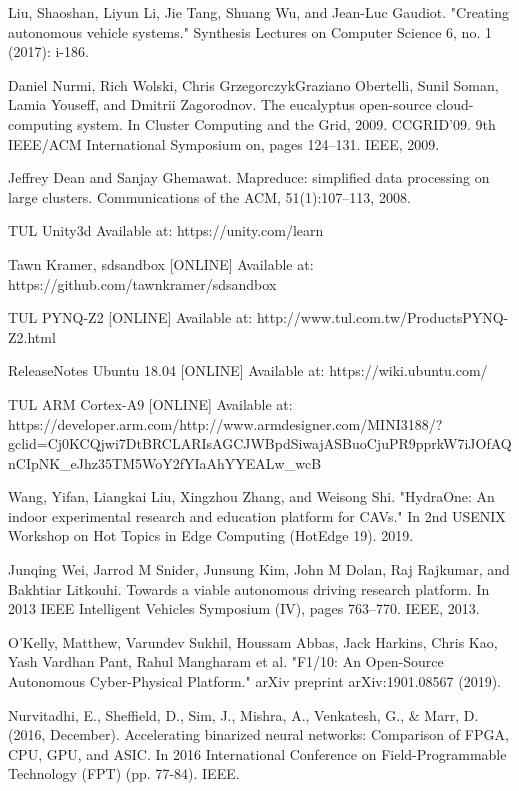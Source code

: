 \documentclass[conference]{IEEEtran}
\begin{document}
\begin{thebibliography}{00}

 Liu, Shaoshan, Liyun Li, Jie Tang, Shuang Wu, and Jean-Luc Gaudiot. "Creating autonomous vehicle systems." Synthesis Lectures on Computer Science 6, no. 1 (2017): i-186.

 Daniel Nurmi, Rich Wolski, Chris GrzegorczykGraziano Obertelli, Sunil Soman, Lamia Youseff, and Dmitrii Zagorodnov. The eucalyptus open-source cloud-computing system. In Cluster Computing and the Grid, 2009. CCGRID’09. 9th IEEE/ACM International Symposium on, pages 124–131. IEEE, 2009.

 Jeffrey Dean and Sanjay Ghemawat. Mapreduce: simplified data processing on large clusters. Communications
of the ACM, 51(1):107–113, 2008.

 TUL Unity3d Available at: https://unity.com/learn

 Tawn Kramer, sdsandbox [ONLINE] Available at: https://github.com/tawnkramer/sdsandbox

 TUL PYNQ-Z2 [ONLINE] Available at: http://www.tul.com.tw/ProductsPYNQ-Z2.html

 ReleaseNotes Ubuntu 18.04 [ONLINE] Available at: https://wiki.ubuntu.com/

 TUL ARM Cortex-A9 [ONLINE] Available at: https://developer.arm.com/http://www.armdesigner.com/MINI3188/?gclid=Cj0KCQjwi7DtBRCLARIsAGCJWBpdSiwajASBuoCjuPR9pprkW7iJOfAQnCIpNK\_eJhz35TM5WoY2fYIaAhYYEALw\_wcB

 Wang, Yifan, Liangkai Liu, Xingzhou Zhang, and Weisong Shi. "HydraOne: An indoor experimental research and education platform for CAVs." In 2nd {USENIX} Workshop on Hot Topics in Edge Computing (HotEdge 19). 2019.

 Junqing Wei, Jarrod M Snider, Junsung Kim, John M Dolan, Raj Rajkumar, and Bakhtiar Litkouhi. Towards a viable autonomous driving research platform. In 2013 IEEE Intelligent Vehicles Symposium (IV), pages 763–770. IEEE, 2013.

 O'Kelly, Matthew, Varundev Sukhil, Houssam Abbas, Jack Harkins, Chris Kao, Yash Vardhan Pant, Rahul Mangharam et al. "F1/10: An Open-Source Autonomous Cyber-Physical Platform." arXiv preprint arXiv:1901.08567 (2019).

 Nurvitadhi, E., Sheffield, D., Sim, J., Mishra, A., Venkatesh, G., \& Marr, D. (2016, December). Accelerating binarized neural networks: Comparison of FPGA, CPU, GPU, and ASIC. In 2016 International Conference on Field-Programmable Technology (FPT) (pp. 77-84). IEEE.


\end{thebibliography}
\end{document}
